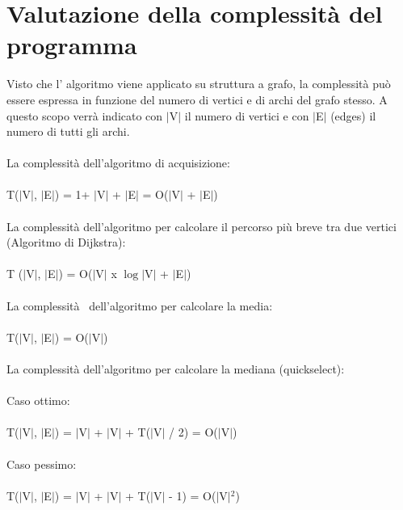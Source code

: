 \documentclass[11pt, a4paper, titlepage, block]{article}
\begin{document}
\section{Valutazione della complessit\`{a} del programma}
	Visto che l' algoritmo viene applicato su struttura a grafo, la complessit\`{a} pu\`{o} essere espressa in 
	funzione del numero di vertici e di archi del grafo stesso. A questo scopo verr\`{a} indicato con $|$V$|$ il 
	numero di vertici e con $|$E$|$ (edges) il numero di tutti gli archi.\\
	\\
	La complessit\`{a} dell'algoritmo di acquisizione:\\\\
	\indent T($|$V$|$, $|$E$|$) = 1+ $|$V$|$ + $|$E$|$ = O($|$V$|$ + $|$E$|$)\\\\
	La complessit\`{a} dell'algoritmo per calcolare il percorso pi\`{u} breve tra due vertici (Algoritmo di Dijkstra):\\\\
	\indent T ($|$V$|$, $|$E$|$) = O($|$V$|$ x $\log$$|$V$|$ + $|$E$|$)\\\\
	La complessit\`{a}  dell'algoritmo per calcolare la media:\\\\
	\indent T($|$V$|$, $|$E$|$) = O($|$V$|$)\\\\
	La complessit\`{a} dell'algoritmo per calcolare la mediana (quickselect):\\\\
	\indent Caso ottimo:\\\\
	\indent \indent T($|$V$|$, $|$E$|$) = $|$V$|$ + $|$V$|$ + T($|$V$|$ / 2) = O($|$V$|$)\\\\
	\indent Caso pessimo:\\\\
	\indent \indent T($|$V$|$, $|$E$|$) = $|$V$|$ + $|$V$|$ + T($|$V$|$ - 1) = O($|$V$|$$^{2}$)\\\\
	\newpage
\end{document}
